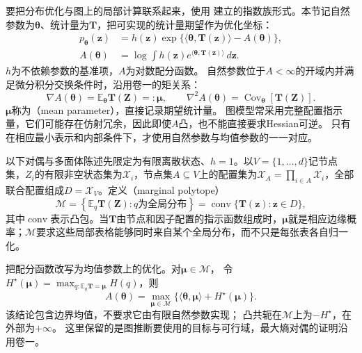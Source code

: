 要把分布优化与图上的局部计算联系起来，使用
建立的指数族形式。本节记自然参数为$\bm\theta$、统计量为$\bm T$，把可实现的统计量期望作为优化坐标：
\begin{equation}
  \begin{aligned}
    p_{\bm{\theta}}(\bm{z})
      &=h(\bm{z})\exp\{\langle\bm{\theta},\bm{T}(\bm{z})\rangle
                      -A(\bm{\theta})\},\\
    A(\bm{\theta})
      &=\log\int h(\bm{z})
          e^{\langle\bm{\theta},\bm{T}(\bm{z})\rangle}\,d\bm{z}.
  \end{aligned}
  \label{eq:pgm-variational-exponential-family}
\end{equation}
$h$为不依赖参数的基准项，$A$为对数配分函数。
自然参数位于$A<\infty$的开域内并满足微分积分交换条件时，沿用卷一的矩关系：
\begin{equation}
  \nabla A(\bm{\theta})=\mathbb E_{\bm{\theta}}\bm{T}(\bm{Z})
      =:\bm{\mu},\qquad
  \nabla^2 A(\bm{\theta})
      =\operatorname{Cov}_{\bm{\theta}}[\bm{T}(\bm{Z})].
  \label{eq:pgm-variational-moments}
\end{equation}
$\bm{\mu}$称为（mean parameter），直接记录期望统计量。
图模型常采用完整配置指示量，它们可能存在仿射冗余，因此即使$A$凸，也不能直接要求Hessian可逆。
只有在相应最小表示和内部条件下，才使用自然参数与均值参数的一一对应。

以下对偶与多面体陈述先限定为有限离散状态、$h=1$。以$V=\{1,\ldots,d\}$记节点集，$Z_i$的有限非空状态集为$\mathcal X_i$，节点集$A\subseteq V$上的配置集为$\mathcal X_A=\prod_{i\in A}\mathcal X_i$，全部联合配置组成$D=\mathcal X_V$。定义（marginal polytope）
\begin{equation}
  \mathcal M
    =\left\{\mathbb E_q\bm{T}(\bm{Z}):q\text{为全局分布}\right\}
    =\operatorname{conv}\{\bm{T}(\bm{z}):\bm{z}\in D\},
  \label{eq:pgm-variational-marginal-polytope}
\end{equation}
其中$\operatorname{conv}$表示凸包。当$\bm{T}$由节点和因子配置的指示函数组成时，$\bm{\mu}$就是相应边缘概率；$\mathcal M$要求这些局部表格能够同时来自某个全局分布，而不只是每张表各自归一化。

把配分函数改写为均值参数上的优化。对$\bm\mu\in\mathcal M$，
令$H^\star(\bm\mu)=\max_{q:\mathbb E_q\bm T=\bm\mu}H(q)$，则
\begin{equation}
  A(\bm\theta)=\max_{\bm\mu\in\mathcal M}
    \{\langle\bm\theta,\bm\mu\rangle+H^\star(\bm\mu)\}.
  \label{eq:pgm-variational-gibbs}
\end{equation}
该结论包含边界均值，不要求它由有限自然参数实现；
凸共轭在$\mathcal M$上为$-H^\star$，在外部为$+\infty$。
这里保留的是图推断要使用的目标与可行域，最大熵对偶的证明沿用卷一。

